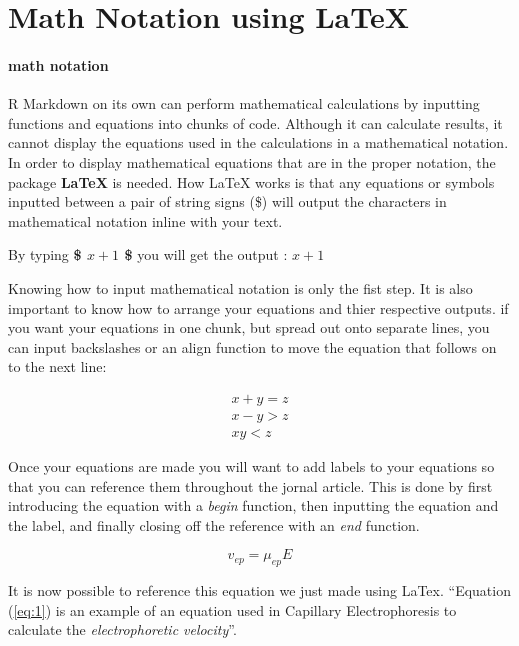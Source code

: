 \documentclass[]{elsarticle} %
\begin{document}
\hypertarget{math-notation-using-latex}{%
\section{Math Notation using LaTeX}\label{math-notation-using-latex}}

\hypertarget{math-notation}{%
\paragraph{math notation}\label{math-notation}}

R Markdown on its own can perform mathematical calculations by inputting
functions and equations into chunks of code. Although it can calculate
results, it cannot display the equations used in the calculations in a
mathematical notation. In order to display mathematical equations that
are in the proper notation, the package \textbf{LaTeX} is needed. How
LaTeX works is that any equations or symbols inputted between a pair of
string signs (\$) will output the characters in mathematical notation
inline with your text.

By typing \textbf{\$ \(x + 1\) \$} you will get the output : \(x+1\)

Knowing how to input mathematical notation is only the fist step. It is
also important to know how to arrange your equations and thier
respective outputs. if you want your equations in one chunk, but spread
out onto separate lines, you can input backslashes or an align function
to move the equation that follows on to the next line:

\begin{align*}
x + y = z\\
x - y > z\\
x  y < z
\end{align*}

Once your equations are made you will want to add labels to your
equations so that you can reference them throughout the jornal article.
This is done by first introducing the equation with a \emph{begin}
function, then inputting the equation and the label, and finally closing
off the reference with an \emph{end} function.

\begin{equation}
\label{eq:1}
v_{ep}=\mu_{ep}E
\end{equation}

It is now possible to reference this equation we just made using LaTex.
``Equation (\ref{eq:1}) is an example of an equation used in Capillary
Electrophoresis to calculate the \emph{electrophoretic velocity}''.
\end{document}

